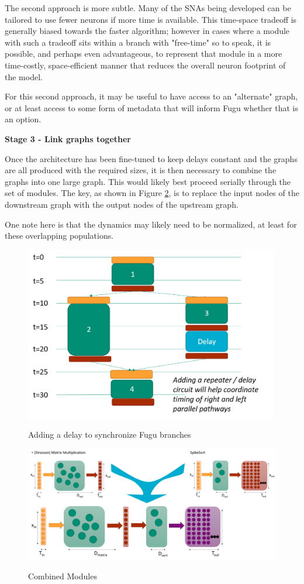 \documentclass{article}
\begin{document}
The second approach is more subtle.  Many of the SNAs being developed can be tailored to use fewer neurons if more time is available.  This time-space tradeoff is generally biased towards the faster algorithm; however in cases where a module with such a tradeoff sits within a branch with "free-time" so to speak, it is possible, and perhaps even advantageous, to represent that module in a more time-costly, space-efficient manner that reduces the overall neuron footprint of the model.

For this second approach, it may be useful to have access to an "alternate" graph, or at least access to some form of metadata that will inform Fugu whether that is an option.

\textbf{Stage 3 - Link graphs together}

Once the architecture has been fine-tuned to keep delays constant and the graphs are all produced with the required sizes, it is then necessary to combine the graphs into one large graph.  This would likely best proceed serially through the set of modules. The key, as shown in Figure \ref{combined}, is to replace the input nodes of the downstream graph with the output nodes of the upstream graph.  

One note here is that the dynamics may likely need to be normalized, at least for these overlapping populations.




\begin{figure}
	\includegraphics[height=3in]{module_link_parallel.png}
	\label{parallel_link}
	\caption{Adding a delay to synchronize Fugu branches}
\end{figure}

\begin{figure}
	\includegraphics[width=5in]{module_combined.png}
	\label{combined}
	\caption{Combined Modules}
\end{figure}
\end{document}
